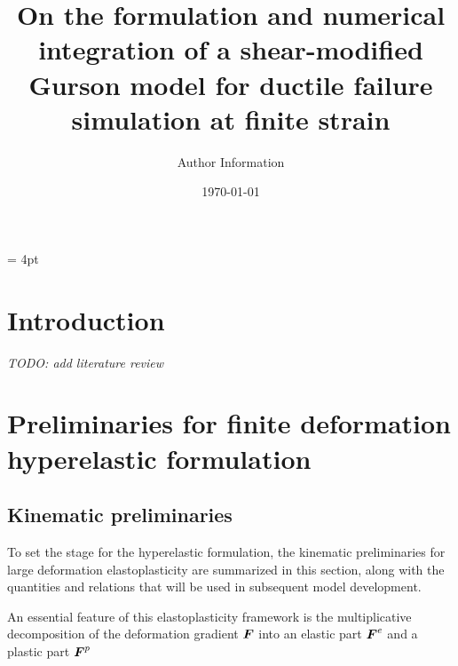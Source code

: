 \documentclass[11pt]{article}
\theoremstyle{remark}
\begin{document}
\setlength{\headheight}{15pt}
\headsep = 4pt




\title{On the formulation and numerical integration of a shear-modified Gurson model for ductile failure simulation at finite strain}

    \author{
     Author Information \\
	 }

\date{\today}

\maketitle

\section{Introduction} \label{sec:introduction}
\textit{TODO: add literature review}



\section{Preliminaries for finite deformation hyperelastic formulation}\label{sec:preliminaries}

\subsection{Kinematic preliminaries}
To set the stage for the hyperelastic formulation, the kinematic
preliminaries for large deformation elastoplasticity are summarized 
in this section, along with the quantities and relations that will be
used in subsequent model development.

An essential feature of this elastoplasticity framework is the
multiplicative decomposition of the deformation gradient ${\boldsymbol{F}}$ into 
an elastic part ${\boldsymbol{F}}^e$ and a plastic part ${\boldsymbol{F}}^p$
\end{document}
